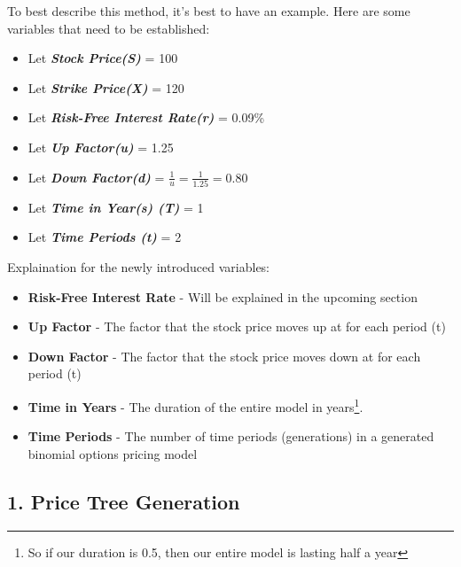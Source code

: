 \documentclass[12pt, letterpaper]{article}
\begin{document}
\bigskip

To best describe this method, it's best to have an example.
Here are some variables that need to be established:

\begin{itemize}[label={}]
  \item Let \textit{\textbf{Stock Price(S)}} = 100
  \item Let \textit{\textbf{Strike Price(X)}} = 120
  \item Let \textit{\textbf{Risk-Free Interest Rate(r)}} = 0.09\%
  \item Let \textit{\textbf{Up Factor(u)}} = 1.25
  \item Let \textit{\textbf{Down Factor(d)}} = ${\frac{1}{u} = \frac{1}{1.25} = 0.80}$
  \item Let \textit{\textbf{Time in Year(s) (T)}}  = 1
  \item Let \textit{\textbf{Time Periods (t)}}  = 2 
\end{itemize}

\bigskip

Explaination for the newly introduced variables:
\begin{itemize}[label={}]
  \item \textbf{Risk-Free Interest Rate} - Will be explained in the upcoming section
  \item \textbf{Up Factor} - The factor that the stock price moves up at for each period (t)
  \item \textbf{Down Factor} - The factor that the stock price moves down at for each period (t)
  \item \textbf{Time in Years} - The duration of the entire model in years\footnote{So if our duration is 0.5, then our entire model is lasting half a year}.
  \item \textbf{Time Periods} - The number of time periods (generations) in a generated binomial options pricing model
\end{itemize}

\pagebreak
\subsection*{1. Price Tree Generation}
\end{document}
